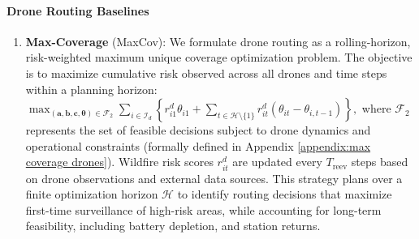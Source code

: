 \documentclass{article}
\newcommand{\set}[1]{\mathcal{#1}}
\newcommand{\rev}[1]{\textcolor{black}{#1}}
\begin{document}
\paragraph{Drone Routing Baselines}
\begin{enumerate}[leftmargin=1.1em, itemsep=0.3em, topsep=0.5em]
    \item \textbf{Max-Coverage} (MaxCov): 
    We formulate drone routing as a rolling-horizon, risk-weighted maximum unique coverage optimization problem. The objective is to maximize cumulative risk observed across all drones and time steps within a planning horizon: $\max_{(\bm a, \bm b, \bm c, \bm \theta) \in \set F_2} \sum_{i \in \set I_d} \left\{r_{i1}^d \theta_{i1} + \sum_{t \in \set H \setminus \{1\}} r_{it}^d (\theta_{it} - \theta_{i,t-1}) \right\}, $ where $\set F_2$ represents the set of feasible decisions subject to drone dynamics and operational constraints (formally defined in Appendix \ref{appendix:max coverage drones}). Wildfire risk scores $r_{it}^d$ are updated every $T_{\text{reev}}$ steps based on drone observations and external data sources. This strategy plans over a finite optimization horizon $\set H$ to identify routing decisions that maximize first-time surveillance of high-risk areas, while accounting for long-term feasibility, including battery depletion, and station returns. 



\end{enumerate}
\end{document}
